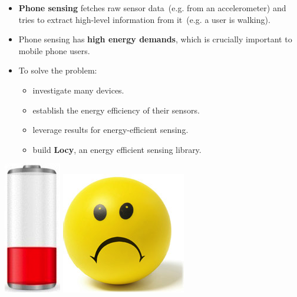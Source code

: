 \documentclass[a2,landscape]{a0poster}
\begin{document}
\begin{itemize}
   \item \textbf{Phone sensing} fetches raw sensor data\ (e.g. from an accelerometer) and tries to extract high-level information from it\ (e.g. a user is walking).
   \item Phone sensing has \textbf{high energy demands}, which is crucially important to mobile phone users.
   \item To solve the problem:
	   \begin{itemize}
   			\item investigate many devices.
   			\item establish the energy efficiency of their sensors.
   			\item leverage results for energy-efficient sensing.
   			\item build \textbf{Locy}, an energy efficient sensing library.
	   \end{itemize}
  \end{itemize}
  
\begin{center}
\includegraphics[scale=0.7]{plots/low_battery}
\includegraphics[scale=0.7]{plots/sad_face}
\end{center}
\end{document}
